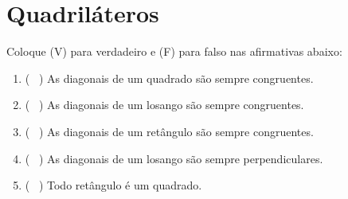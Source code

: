 			\section{Quadriláteros}
			
				\item  Coloque (V) para verdadeiro e (F) para falso nas afirmativas abaixo:
				\begin{enumerate}
				\item ( \ ) As diagonais de um quadrado são sempre congruentes.
				\item ( \ ) As diagonais de um losango são sempre congruentes.
				\item ( \ ) As diagonais de um retângulo são sempre congruentes.
				\item ( \ ) As diagonais de um losango são sempre perpendiculares.
				\item ( \ ) Todo retângulo é um quadrado.
				\end{enumerate}
				
